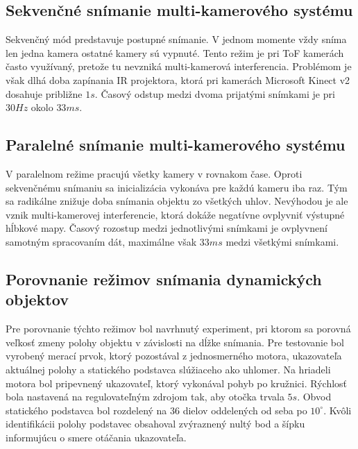 \subsection{Sekvenčné snímanie multi-kamerového systému}

Sekvenčný mód predstavuje postupné snímanie. V jednom momente vždy sníma len jedna kamera ostatné kamery sú vypnuté. Tento režim je pri ToF kamerách často využívaný, pretože tu nevzniká multi-kamerová interferencia. Problémom je však dlhá doba zapínania IR projektora, ktorá pri kamerách Microsoft Kinect v2 dosahuje približne $1s$. Časový odstup medzi dvoma prijatými snímkami je pri $30Hz$ okolo $33ms$.

\subsection{Paralelné snímanie multi-kamerového systému}

V paralelnom režime pracujú všetky kamery v rovnakom čase. Oproti sekvenčnému snímaniu sa inicializácia vykonáva pre každú kameru iba raz. Tým sa radikálne znižuje doba snímania objektu zo všetkých uhlov. Nevýhodou je ale vznik multi-kamerovej interferencie, ktorá dokáže negatívne ovplyvniť výstupné hĺbkové mapy. Časový rozostup medzi jednotlivými snímkami je ovplyvnení samotným spracovaním dát, maximálne však $33ms$ medzi všetkými snímkami. 

\subsection{Porovnanie režimov snímania dynamických objektov}

Pre porovnanie týchto režimov bol navrhnutý experiment, pri ktorom sa porovná veľkosť zmeny polohy objektu v závislosti na dĺžke snímania. Pre testovanie bol vyrobený merací prvok, ktorý pozostával z jednosmerného motora, ukazovateľa aktuálnej polohy a statického podstavca slúžiaceho ako uhlomer. Na hriadeli motora bol pripevnený ukazovateľ, ktorý vykonával pohyb po kružnici. Rýchlosť bola nastavená na regulovateľným zdrojom tak, aby otočka trvala $5s$. Obvod statického podstavca bol rozdelený na 36 dielov oddelených od seba po $10^\circ$. Kvôli identifikácii polohy podstavec obsahoval zvýraznený nultý bod a šípku informujúcu o smere otáčania ukazovateľa.  

